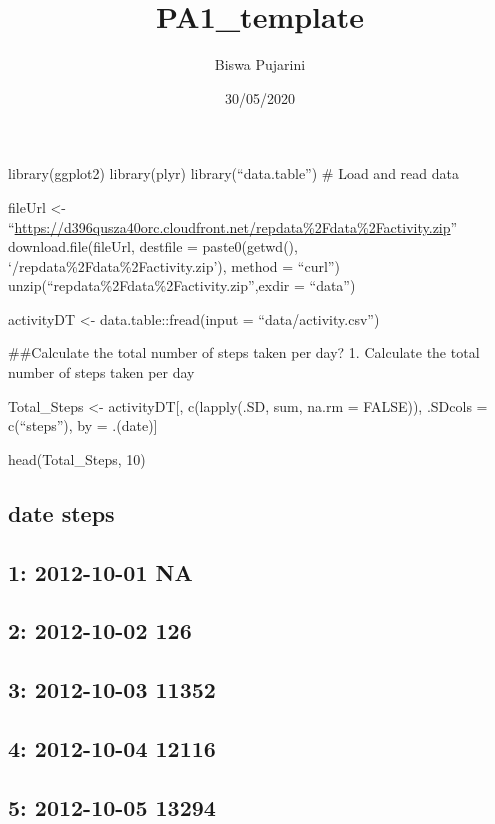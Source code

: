 \documentclass[
]{article}
\title{PA1\_template}
\author{Biswa Pujarini}
\date{30/05/2020}
\begin{document}
\maketitle

library(ggplot2) library(plyr) library(``data.table'') \# Load and read
data

fileUrl \textless-
``\url{https://d396qusza40orc.cloudfront.net/repdata\%2Fdata\%2Factivity.zip}''
download.file(fileUrl, destfile = paste0(getwd(),
`/repdata\%2Fdata\%2Factivity.zip'), method = ``curl'')
unzip(``repdata\%2Fdata\%2Factivity.zip'',exdir = ``data'')

activityDT \textless- data.table::fread(input = ``data/activity.csv'')

\#\#Calculate the total number of steps taken per day? 1. Calculate the
total number of steps taken per day

Total\_Steps \textless- activityDT{[}, c(lapply(.SD, sum, na.rm =
FALSE)), .SDcols = c(``steps''), by = .(date){]}

head(Total\_Steps, 10)

\hypertarget{date-steps}{%
\subsection{date steps}\label{date-steps}}

\hypertarget{na}{%
\subsection{1: 2012-10-01 NA}\label{na}}

\hypertarget{section}{%
\subsection{2: 2012-10-02 126}\label{section}}

\hypertarget{section-1}{%
\subsection{3: 2012-10-03 11352}\label{section-1}}

\hypertarget{section-2}{%
\subsection{4: 2012-10-04 12116}\label{section-2}}

\hypertarget{section-3}{%
\subsection{5: 2012-10-05 13294}\label{section-3}}
\end{document}
